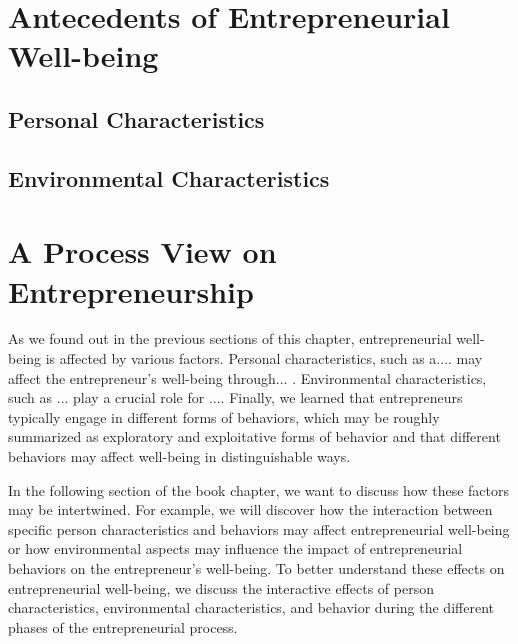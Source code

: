 \documentclass[a4paper,man,natbib]{apa6}
\begin{document}
\section{Antecedents of Entrepreneurial Well-being}
\subsection{Personal Characteristics}
\subsection{Environmental Characteristics}
\section{A Process View on Entrepreneurship}
As we found out in the previous sections of this chapter, entrepreneurial well-being is affected by various factors. Personal characteristics, such as a.... may affect the entrepreneur's well-being through... . Environmental characteristics, such as ... play a crucial role for .... Finally, we learned that entrepreneurs typically engage in different forms of behaviors, which may be roughly summarized as exploratory and exploitative forms of behavior and that different behaviors may affect well-being in distinguishable ways. \par
In the following section of the book chapter, we want to discuss how these factors may be intertwined. For example, we will discover how the interaction between specific person characteristics and behaviors may affect entrepreneurial well-being or how environmental aspects may influence the impact of entrepreneurial behaviors on the entrepreneur's well-being. To better understand these effects on entrepreneurial well-being, we discuss the interactive effects of person characteristics, environmental characteristics, and behavior during the different phases of the entrepreneurial process. \par
\end{document}
